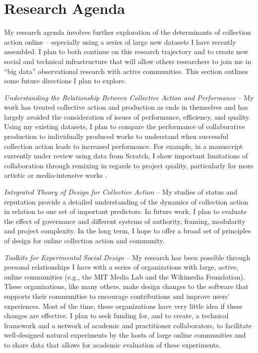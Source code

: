 \documentclass[10pt]{memoir}
\begin{document}

\section{Research Agenda}

My research agenda involves further exploration of the determinants of
collection action online -- especially using a series of large new
datasets I have recently assembled. I plan to both continue on this
research trajectory and to create new social and technical
infrastructure that will allow others researchers to join me in ``big
data'' observational research with active communities. This section
outlines some future directions I plan to explore.

\emph{Understanding the Relationship Between Collective Action and
  Performance} -- My work has treated collective action and production
as ends in themselves and has largely avoided the consideration of
issues of performance, efficiency, and quality. Using my existing
datasets, I plan to compare the performance of collaborative
production to individually produced works to understand when
successful collection action leads to increased performance. For
example, in a manuscript currently under review using data from
Scratch, I show important limitations of collaboration through
remixing in regards to project quality, particularly for more artistic
or media-intensive works \cite{hill_cost_2012}.

\emph{Integrated Theory of Design for Collective Action} -- My studies
of status and reputation provide a detailed understanding of the dynamics of
collection action in relation to one set of important predictors. In future
work, I plan to evaluate the effect of governance and different
systems of authority, framing, modularity and project complexity. In
the long term, I hope to offer a broad set of principles of
design for online collection action and community.

\emph{Toolkits for Experimental Social Design} -- My research has been
possible through personal relationships I have with a series of
organizations with large, active, online communities (e.g., the MIT
Media Lab and the Wikimedia Foundation). These organizations, like
many others, make design changes to the software that supports their
communities to encourage contributions and improve users'
experiences. Most of the time, these organizations have very little
idea if these changes are effective. I plan to seek funding for, and
to create, a technical framework and a network of academic and
practitioner collaborators, to facilitate well-designed natural
experiments by the hosts of large online communities and to share data
that allows for academic evaluation of these experiments.
\end{document}
